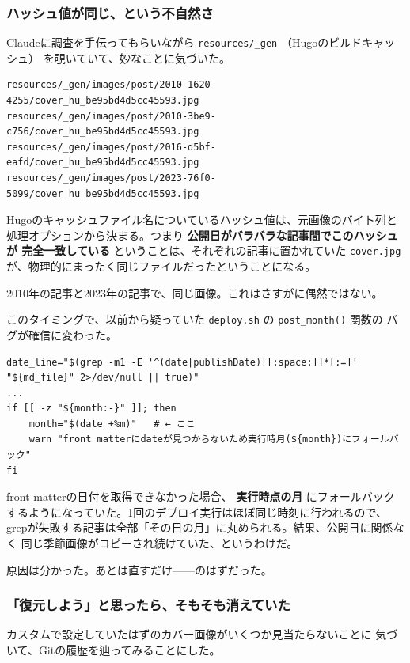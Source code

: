 \documentclass[11pt]{article}
\begin{document}
\subsubsection{ハッシュ値が同じ、という不自然さ}
\label{sec:org0e27634}

Claudeに調査を手伝ってもらいながら \texttt{resources/\_gen} （Hugoのビルドキャッシュ）
を覗いていて、妙なことに気づいた。

\begin{verbatim}
resources/_gen/images/post/2010-1620-4255/cover_hu_be95bd4d5cc45593.jpg
resources/_gen/images/post/2010-3be9-c756/cover_hu_be95bd4d5cc45593.jpg
resources/_gen/images/post/2016-d5bf-eafd/cover_hu_be95bd4d5cc45593.jpg
resources/_gen/images/post/2023-76f0-5099/cover_hu_be95bd4d5cc45593.jpg
\end{verbatim}

Hugoのキャッシュファイル名についているハッシュ値は、元画像のバイト列と
処理オプションから決まる。つまり \textbf{公開日がバラバラな記事間でこのハッシュが
完全一致している} ということは、それぞれの記事に置かれていた
\texttt{cover.jpg} が、物理的にまったく同じファイルだったということになる。

2010年の記事と2023年の記事で、同じ画像。これはさすがに偶然ではない。

このタイミングで、以前から疑っていた \texttt{deploy.sh} の \texttt{post\_month()} 関数の
バグが確信に変わった。

\begin{verbatim}
date_line="$(grep -m1 -E '^(date|publishDate)[[:space:]]*[:=]' "${md_file}" 2>/dev/null || true)"
...
if [[ -z "${month:-}" ]]; then
    month="$(date +%m)"   # ← ここ
    warn "front matterにdateが見つからないため実行時月(${month})にフォールバック"
fi
\end{verbatim}

front matterの日付を取得できなかった場合、 \textbf{実行時点の月} にフォールバック
するようになっていた。1回のデプロイ実行はほぼ同じ時刻に行われるので、
grepが失敗する記事は全部「その日の月」に丸められる。結果、公開日に関係なく
同じ季節画像がコピーされ続けていた、というわけだ。

原因は分かった。あとは直すだけ——のはずだった。
\subsubsection{「復元しよう」と思ったら、そもそも消えていた}
\label{sec:org31fc94f}

カスタムで設定していたはずのカバー画像がいくつか見当たらないことに
気づいて、Gitの履歴を辿ってみることにした。
\end{document}
